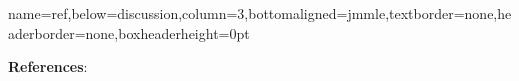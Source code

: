\documentclass[landscape,a0paper,fontscale=0.4]{baposter} %
\newcommand{\compresslist}{ %
\setlength{\itemsep}{1pt}
\setlength{\parskip}{0pt}
\setlength{\parsep}{0pt}
}
\begin{document}
\begin{poster}
\headerbox{}
{name=ref,below=discussion,column=3,bottomaligned=jmmle,textborder=none,headerborder=none,boxheaderheight=0pt}
{
{\scriptsize
\textbf{References}:
\vspace{-.7em}
\renewcommand{\section}[2]{\vskip 0.05em} %
\setlength{\bibsep}{0pt plus 0.1ex}


}
}

%

\end{poster}
\end{document}
